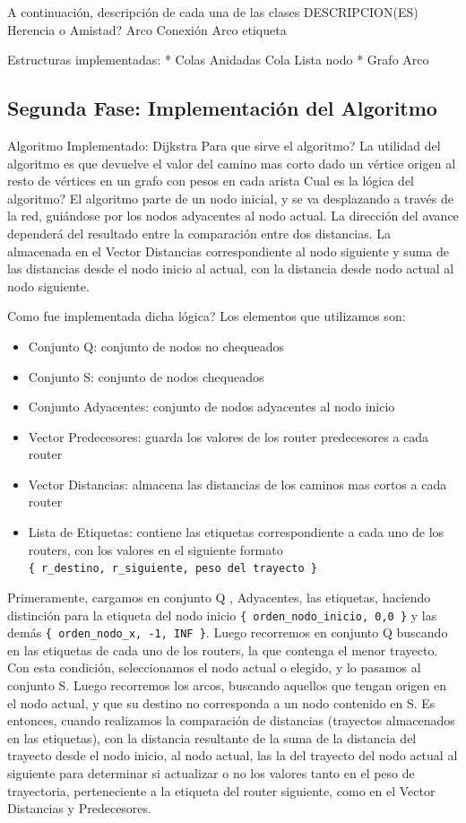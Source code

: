 \documentclass[12pt]{article} %
\begin{document}
A continuación, descripción de cada una de  las clases
DESCRIPCION(ES)
Herencia o Amistad? 
Arco Conexión
Arco  etiqueta


Estructuras implementadas:
 * Colas Anidadas Cola Lista nodo
 * Grafo Arco			

\subsection{Segunda Fase: Implementación del Algoritmo} %
Algoritmo Implementado: Dijkstra
Para que sirve el algoritmo? La utilidad del algoritmo es que devuelve el valor del camino mas corto 
dado un vértice origen al resto de vértices en un grafo con pesos en cada arista
Cual es  la lógica del algoritmo? El algoritmo parte de un nodo inicial, y se va desplazando a través de  la red, guiándose por los nodos adyacentes al nodo actual. 
La dirección del avance dependerá del resultado entre la comparación entre dos distancias. La almacenada en el Vector Distancias correspondiente al nodo siguiente y suma de las distancias desde el nodo inicio al actual, con la distancia desde nodo actual al nodo siguiente.

Como fue implementada dicha lógica?  Los elementos  que utilizamos son:
\begin{itemize}
\item Conjunto Q: conjunto de nodos no chequeados
\item Conjunto S: conjunto de nodos chequeados
\item Conjunto Adyacentes: conjunto de nodos adyacentes al nodo inicio
\item Vector Predecesores: guarda los valores de los router predecesores a cada router
\item Vector Distancias: almacena las distancias de los caminos mas cortos a cada router
\item Lista de Etiquetas: contiene las etiquetas correspondiente a cada uno de los routers, con los valores en el siguiente formato \\
\verb+{ r_destino, r_siguiente, peso del trayecto }+
\end{itemize}

Primeramente, cargamos en conjunto Q , Adyacentes, las etiquetas, haciendo distinción para la etiqueta del nodo inicio \verb+{ orden_nodo_inicio, 0,0 }+ y las demás \verb+{ orden_nodo_x, -1, INF }+.
Luego recorremos en conjunto Q buscando en las etiquetas de cada uno de los routers, la que contenga el menor trayecto. Con esta condición, seleccionamos el nodo actual o elegido, y lo pasamos al conjunto S.
Luego recorremos los arcos, buscando aquellos que tengan origen en el nodo actual, y que su destino no corresponda a un nodo contenido en S. 
Es entonces, cuando realizamos la comparación de distancias (trayectos almacenados en las etiquetas), con la distancia resultante de la suma de la distancia del trayecto desde el nodo inicio, al nodo actual, las la del trayecto del nodo actual al siguiente para determinar si actualizar o no los valores tanto en el peso de trayectoria, perteneciente a la etiqueta del router siguiente,  como en el Vector Distancias y Predecesores.
\end{document}

